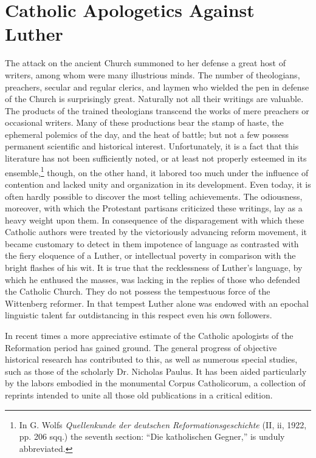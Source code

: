 \section{Catholic Apologetics Against Luther}

The attack on the ancient Church summoned to her defense a
great host of writers, among whom were many illustrious minds.
The number of theologians, preachers, secular and regular clerics, and
laymen who wielded the pen in defense of the Church is surprisingly
great. Naturally not all their writings are valuable. The products
of the trained theologians transcend the works of mere preachers
or occasional writers. Many of these productions bear the stamp of
haste, the ephemeral polemics of the day, and the heat of battle; but
not a few possess permanent scientific and historical interest.
Unfortunately, it is a fact that this literature has not been sufficiently
noted, or at least not properly esteemed in its ensemble,\footnote
{In G. Wolfs \textit{Quellenkunde der deutschen Reformationsgeschichte} (II, ii, 1922, pp. 206
sqq.) the seventh section: “Die katholischen Gegner,” is unduly abbreviated.}
though, on the other hand, it labored too much under the influence
of contention and lacked unity and organization in its development.
Even today, it is often hardly possible to discover the most telling
achievements. The odiousness, moreover, with which the Protestant
partisans criticized these writings, lay as a heavy weight upon them.
In consequence of the disparagement with which these Catholic
authors were treated by the victoriously advancing reform movement,
it became customary to detect in them impotence of language
as contrasted with the fiery eloquence of a Luther, or intellectual
poverty in comparison with the bright flashes of his wit. It is true that
the recklessness of Luther’s language, by which he enthused the masses,
was lacking in the replies of those who defended the Catholic Church.
They do not possess the tempestuous force of the Wittenberg reformer.
In that tempest Luther alone was endowed with an epochal
linguistic talent far outdistancing in this respect even his own
followers.

In recent times a more appreciative estimate of the Catholic apologists
of the Reformation period has gained ground. The general
progress of objective historical research has contributed to this, as
well as numerous special studies, such as those of the scholarly Dr.
Nicholas Paulus. It has been aided particularly by the labors embodied
in the monumental Corpus Catholicorum, a collection of reprints
intended to unite all those old publications in a critical edition.

